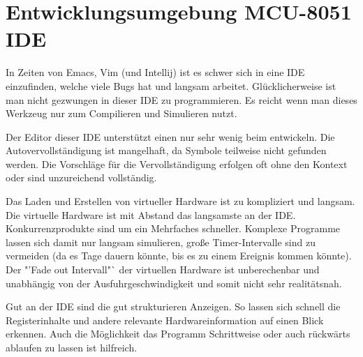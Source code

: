   
 
 \section{Entwicklungsumgebung MCU-8051 IDE} 
 
 In Zeiten von Emacs, Vim (und Intellij) ist es schwer sich in eine IDE einzufinden, welche viele Bugs hat und langsam arbeitet. 
 Glücklicherweise ist man nicht gezwungen in dieser IDE zu programmieren. Es reicht wenn man dieses Werkzeug nur zum Compilieren und Simulieren nutzt. 
 
 Der Editor dieser IDE unterstützt einen nur sehr wenig beim entwickeln. 
 Die Autovervollständigung ist mangelhaft, da Symbole teilweise nicht gefunden werden. Die Vorschläge für die Vervollständigung erfolgen oft ohne den Kontext oder sind unzureichend vollständig. 
 
 Das Laden und Erstellen von virtueller Hardware ist zu kompliziert und langsam. Die virtuelle Hardware ist mit Abstand das langsamste an der IDE. Konkurrenzprodukte sind um ein Mehrfaches schneller. Komplexe Programme lassen sich damit nur langsam simulieren, große Timer-Intervalle sind zu vermeiden (da es Tage dauern könnte, bis es zu einem Ereignis kommen könnte).
 Der "'Fade out Intervall"` der virtuellen Hardware ist unberechenbar und unabhängig von der Ausfuhrgeschwindigkeit und somit nicht sehr realitätsnah.  
 
 Gut an der IDE sind die gut strukturieren Anzeigen. So lassen sich schnell die Registerinhalte und andere relevante Hardwareinformation auf einen Blick erkennen. Auch die Möglichkeit das Programm Schrittweise oder auch rückwärts ablaufen zu lassen ist hilfreich.
 
 
 
 
 
 
 
 
 
 
